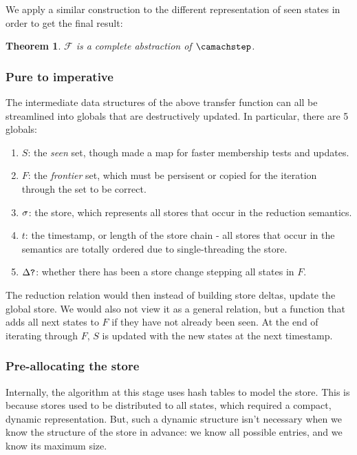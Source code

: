 \documentclass[preprint,onecolumn,9pt]{sigplanconf} %
\newtheorem{theorem}{Theorem}
\begin{document}
We apply a similar construction to the different representation of seen states in order to get the final result:

\begin{theorem}
${\mathcal F}$ is a complete abstraction of $\camachstep$.
\end{theorem}

\subsubsection{Pure to imperative}

The intermediate data structures of the above transfer function can all be streamlined into globals that are destructively updated. In particular, there are 5 globals:

\begin{enumerate}
\item{$S$: the \emph{seen} set, though made a map for faster membership tests and updates.}
\item{$F$: the \emph{frontier} set, which must be persisent or copied for the iteration through the set to be correct.}
\item{$\sigma$: the store, which represents all stores that occur in the reduction semantics.}
\item{$t$: the timestamp, or length of the store chain - all stores that occur in the semantics are totally ordered due to single-threading the store.}
\item{$\Delta\mbox{{\tt ?}}$: whether there has been a store change stepping all states in $F$.}
\end{enumerate}

The reduction relation would then instead of building store deltas,
update the global store. We would also not view it as a general
relation, but a function that adds all next states to $F$ if they have
not already been seen. At the end of iterating through $F$, $S$ is
updated with the new states at the next timestamp.

\subsubsection{Pre-allocating the store}

Internally, the algorithm at this stage uses hash tables to model the store.
%
This is because stores used to be distributed to all states, which
required a compact, dynamic representation.
%
But, such a dynamic structure isn't necessary when we know the
structure of the store in advance: we know all possible entries, and
we know its maximum size.
\end{document}
